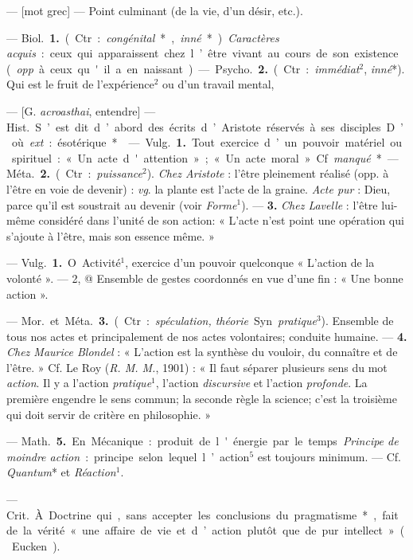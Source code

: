 \begin{itemize}[leftmargin=1cm, label=, itemsep=1pt]
 — [mot grec] — Point culminant
(de la vie, d’un désir, etc.).

 — \si{Biol.} {\bf 1.} (Ctr. : {\it congénital}*,
{\it inné}*). {\it Caractères acquis} : ceux qui
apparaissent chez l’être vivant au
cours de son existence ({\it opp}. à ceux
qu'il a en naissant).

— \si{Psycho.} {\bf 2.} (Ctr. : {\it immédiat}$^2$,
{\it inné}*). Qui est le fruit de l’expérience$^2$ ou d’un travail mental,

 — [G. {\it acroasthai}, entendre] — \si{Hist.} S’est dit d’abord des
écrits d’Aristote réservés à ses disciples. D’où {\it ext}. : ésotérique*.

 — \si{Vulg.} {\bf 1.} Tout exercice d’un
pouvoir matériel ou spirituel : « Un
acte d'attention »; « Un acte moral ».
Cf. {\it manqué}*.

— \si{Méta.} {\bf 2.} (Ctr.: {\it puissance}$^2$). {\it Chez
Aristote} : l'être pleinement réalisé
(opp. à l'être en voie de devenir) :
{\it vg}. la plante est l'acte de la graine.
{\it Acte pur} : Dieu, parce qu’il est soustrait au devenir (voir {\it Forme}$^1$). —
 {\bf 3.} {\it Chez Lavelle} : l'être lui-même
considéré dans l’unité de son action:
« L'acte n’est point une opération
qui s'ajoute à l'être, mais son
essence même. »

 — \si{Vulg.} {\bf 1.} O Activité$^1$, exercice d’un pouvoir quelconque
« L'action de la volonté ». — 2, @
Ensemble de gestes coordonnés
en vue d'une fin : « Une bonne
action ».

— \si{Mor.} et \si{Méta.} {\bf 3.} (Ctr. : {\it spéculation, théorie}. Syn. {\it pratique}$^3$).
Ensemble de tous nos actes et principalement de nos actes volontaires;
conduite humaine. — {\bf 4.} {\it Chez Maurice Blondel} : « L'action est la
synthèse du vouloir, du connaître et de
l'être. » Cf. Le Roy ({\it R. M. M.}, 1901) :
« Il faut séparer plusieurs sens du
mot {\it action}. Il y a l’action {\it pratique}$^1$,
l’action {\it discursive} et l'action {\it profonde}. La première engendre le sens
commun; la seconde règle la science;
c’est la troisième qui doit servir de
critère en philosophie. »

— \si{Math.} {\bf 5.} En Mécanique : produit de l'énergie par le temps.
{\it Principe de moindre action} : principe
selon lequel l’action$^5$ est toujours
minimum. — Cf. {\it Quantum}* et
{\it Réaction}$^1$.

 — \si{Crit.} À Doctrine qui, 
sans accepter les conclusions du
pragmatisme*, fait de la vérité
« une affaire de vie et d’action plutôt
que de pur intellect » (Eucken).


\end{itemize}
